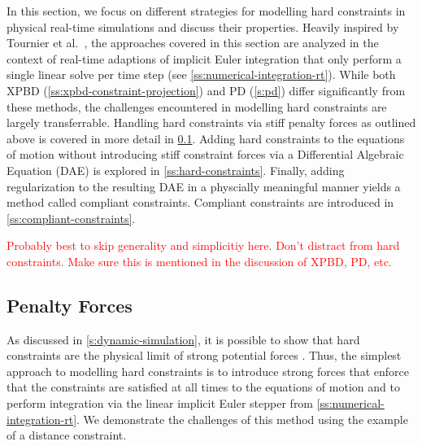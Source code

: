 In this section, we focus on different strategies for modelling hard constraints in physical real-time simulations and discuss 
their properties. Heavily inspired by Tournier et al.\ \cite{tournier2015}, the approaches covered in this section are analyzed 
in the context of real-time adaptions of implicit Euler integration that only perform a single linear solve per time step 
(see \cref{ss:numerical-integration-rt}). While both XPBD (\cref{ss:xpbd-constraint-projection}) and PD (\cref{s:pd}) differ significantly 
from these methods, the challenges encountered in modelling hard constraints are largely transferrable. Handling hard constraints 
via stiff penalty forces as outlined above is covered in more detail in \cref{ss:penalty-forces}. Adding hard constraints to the equations
of motion without introducing stiff constraint forces via a Differential Algebraic Equation (DAE) is explored in \cref{ss:hard-constraints}.
Finally, adding regularization to the resulting DAE in a physcially meaningful manner yields a method called compliant constraints. 
Compliant constraints are introduced in \cref{ss:compliant-constraints}.

\textcolor{red}{Probably best to skip generality and simplicitiy here. Don't distract from hard constraints. Make sure this is 
mentioned in the discussion of XPBD, PD, etc.}

\subsection{Penalty Forces}\label{ss:penalty-forces}
As discussed in \cref{s:dynamic-simulation}, it is possible to show that hard constraints are the physical limit of strong potential 
forces \cite{servin2006}. Thus, the simplest approach to modelling hard constraints is to introduce strong forces that enforce 
that the constraints are satisfied at all times to the equations of motion and to perform integration via the linear implicit Euler
stepper from \cref{ss:numerical-integration-rt}. We demonstrate the challenges of this method using the example of 
a distance constraint.

